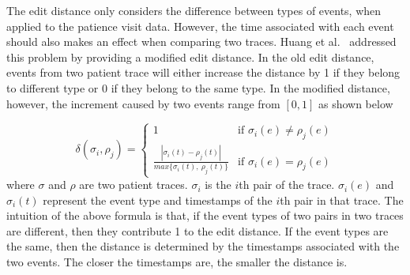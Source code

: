 The edit distance only considers the difference between types of events, when applied to the patience visit data. However, the time associated with each event should also makes an effect when comparing two traces. Huang et al.~\cite{huang2012anomaly} addressed this problem by providing a modified edit distance. In the old edit distance, events from two patient trace will either increase the distance by 1 if they belong to different type or 0 if they belong to the same type. In the modified distance, however, the increment caused by two events range from $\left[ 0, 1\right] $ as shown below

\begin{equation*}
\delta(\sigma_i, \rho_j) = \begin{cases} 
   1 & \text{if } \sigma_i(e) \neq \rho_j(e) \\
   \frac{| \sigma_i(t) - \rho_j(t) | }{max\{\sigma_i(t),~ \rho_j(t)\}}       & \text{if } \sigma_i(e) = \rho_j(e)
  \end{cases}
\end{equation*}
where $\sigma$ and $\rho$ are two patient traces. $\sigma_i$ is the $i$th pair of the trace. $\sigma_i(e)$ and $\sigma_i(t)$ represent the event type and timestamps of the $i$th pair in that trace. The intuition of the above formula is that, if the event types of two pairs in two traces are different, then they contribute 1 to the edit distance. If the event types are the same, then the distance is determined by the timestamps associated with the two events. The closer the timestamps are, the smaller the distance is. 


